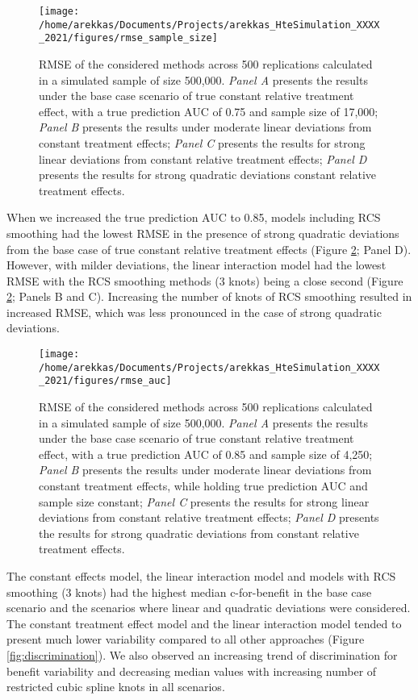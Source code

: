 \documentclass{article}
\begin{document}
\begin{figure}
\texttt{[image: /home/arekkas/Documents/Projects/arekkas\_HteSimulation\_XXXX\_2021/figures/rmse\_sample\_size]} \caption{RMSE of the considered methods across 500 replications calculated in a simulated sample of size 500,000. \textit{Panel A} presents the results under the base case scenario of true constant relative treatment effect, with a true prediction AUC of 0.75 and sample size of 17,000; \textit{Panel B} presents the results under moderate linear deviations from constant treatment effects; \textit{Panel C} presents the results for strong linear deviations from constant relative treatment effects; \textit{Panel D} presents the results for strong quadratic deviations constant relative treatment effects.}\label{fig:rmsesamplesize}
\end{figure}

When we increased the true prediction AUC to 0.85, models including RCS
smoothing had the lowest RMSE in the presence of strong quadratic
deviations from the base case of true constant relative treatment
effects (Figure \ref{fig:rmseauc}; Panel D). However, with milder
deviations, the linear interaction model had the lowest RMSE with the
RCS smoothing methods (3 knots) being a close second (Figure
\ref{fig:rmseauc}; Panels B and C). Increasing the number of knots of
RCS smoothing resulted in increased RMSE, which was less pronounced in
the case of strong quadratic deviations.

\begin{figure}
\texttt{[image: /home/arekkas/Documents/Projects/arekkas\_HteSimulation\_XXXX\_2021/figures/rmse\_auc]} \caption{RMSE of the considered methods across 500 replications calculated in a simulated sample of size 500,000. \textit{Panel A} presents the results under the base case scenario of true constant relative treatment effect, with a true prediction AUC of 0.85 and sample size of 4,250; \textit{Panel B} presents the results under moderate linear deviations from constant treatment effects, while holding true prediction AUC and sample size constant; \textit{Panel C} presents the results for strong linear deviations from constant relative treatment effects; \textit{Panel D} presents the results for strong quadratic deviations from constant relative treatment effects.}\label{fig:rmseauc}
\end{figure}

The constant effects model, the linear interaction model and models with
RCS smoothing (3 knots) had the highest median c-for-benefit in the base
case scenario and the scenarios where linear and quadratic deviations
were considered. The constant treatment effect model and the linear
interaction model tended to present much lower variability compared to
all other approaches (Figure \ref{fig:discrimination}). We also observed
an increasing trend of discrimination for benefit variability and
decreasing median values with increasing number of restricted cubic
spline knots in all scenarios.
\end{document}
